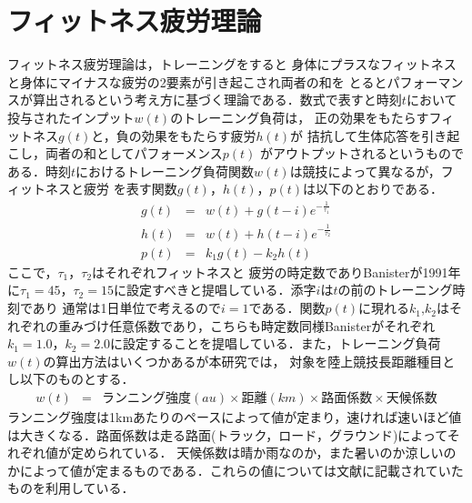 \documentclass[12pt]{jarticle}
\begin{document}
\section{フィットネス疲労理論}
フィットネス疲労理論\cite{bani}は，トレーニングをすると
身体にプラスなフィットネスと身体にマイナスな疲労の2要素が引き起こされ両者の和を
とるとパフォーマンスが算出されるという考え方に基づく理論である．数式で表すと時刻$t$において投与されたインプット$w(t)$のトレーニング負荷は，
正の効果をもたらすフィットネス$g(t)$と，負の効果をもたらす疲労$h(t)$が
拮抗して生体応答を引き起こし，両者の和としてパフォーメンス$p(t)$
がアウトプットされるというものである．時刻$t$におけるトレーニング負荷関数$w(t)$は競技によって異なるが，フィットネスと疲労
を表す関数$g(t)，h(t)，p(t)$は以下のとおりである．
\begin{eqnarray}
  g(t)&=&w(t)+g(t-i)e^{-\frac{1}{\tau_1}}\label{eq:fit1}\\%
  h(t)&=&w(t)+h(t-i)e^{-\frac{1}{\tau_2}}\label{eq:fig1}\\%
  p(t)&=&k_1g(t)-k_2h(t)\label{eq:per1}%
\end{eqnarray}
ここで，$\tau_1$，$\tau_2$はそれぞれフィットネスと
疲労の時定数でありBanisterが1991年に$\tau_1=45$，$\tau_2=15$に設定すべきと提唱している\cite{fitfig}．添字$i$は$t$の前のトレーニング時刻であり
通常は1日単位で考えるので$i=1$である．関数$p(t)$に現れる$k_1$,$k_2$はそれぞれの重みづけ任意係数であり，こちらも時定数同様Banisterがそれぞれ
$k_1=1.0$，$k_2=2.0$に設定することを提唱している\cite{fitfig}．また，トレーニング負荷$w(t)$の算出方法はいくつかあるが本研究では，
対象を陸上競技長距離種目とし以下のものとする．
\begin{eqnarray}
  w(t)&=&ランニング強度(au)\times 距離(km)\times 路面係数\times 天候係数\label{eq:w1}%
\end{eqnarray}
ランニング強度は1kmあたりのペースによって値が定まり，速ければ速いほど値は大きくなる．路面係数は走る路面(トラック，ロード，グラウンド)によってそれぞれ値が定められている．
天候係数は晴か雨なのか，また暑いのか涼しいのかによって値が定まるものである．これらの値については文献\cite{fitfig1}に記載されていたものを利用している．
\end{document}
